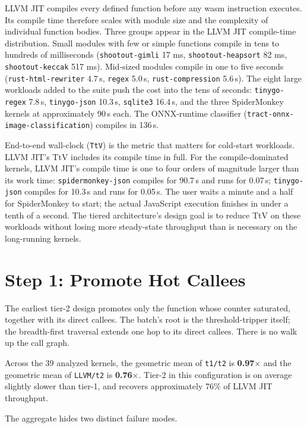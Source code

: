 LLVM JIT compiles every defined function before any wasm instruction executes. Its compile time therefore scales with module size and the complexity of individual function bodies. Three groups appear in the LLVM JIT compile-time distribution. Small modules with few or simple functions compile in tens to hundreds of milliseconds (\texttt{shootout-gimli} 17 ms, \texttt{shootout-heapsort} 82 ms, \texttt{shootout-keccak} 517 ms). Mid-sized modules compile in one to five seconds (\texttt{rust-html-rewriter} 4.7\,s, \texttt{regex} 5.0\,s, \texttt{rust-compression} 5.6\,s). The eight large workloads added to the suite push the cost into the tens of seconds: \texttt{tinygo-regex} 7.8\,s, \texttt{tinygo-json} 10.3\,s, \texttt{sqlite3} 16.4\,s, and the three SpiderMonkey kernels at approximately 90\,s each. The ONNX-runtime classifier (\texttt{tract-onnx-image-classification}) compiles in 136\,s.

End-to-end wall-clock (\texttt{TtV}) is the metric that matters for cold-start workloads. LLVM JIT's TtV includes its compile time in full. For the compile-dominated kernels, LLVM JIT's compile time is one to four orders of magnitude larger than its work time: \texttt{spidermonkey-json} compiles for 90.7\,s and runs for 0.07\,s; \texttt{tinygo-json} compiles for 10.3\,s and runs for 0.05\,s. The user waits a minute and a half for SpiderMonkey to start; the actual JavaScript execution finishes in under a tenth of a second. The tiered architecture's design goal is to reduce TtV on these workloads without losing more steady-state throughput than is necessary on the long-running kernels.

\section{Step 1: Promote Hot Callees}
\label{sec:eval:step1}

The earliest tier-2 design promotes only the function whose counter saturated, together with its direct callees. The batch's root is the threshold-tripper itself; the breadth-first traversal extends one hop to its direct callees. There is no walk up the call graph.

Across the 39 analyzed kernels, the geometric mean of \texttt{t1/t2} is \textbf{0.97$\times$} and the geometric mean of \texttt{LLVM/t2} is \textbf{0.76$\times$}. Tier-2 in this configuration is on average slightly slower than tier-1, and recovers approximately 76\% of LLVM JIT throughput.

The aggregate hides two distinct failure modes.

